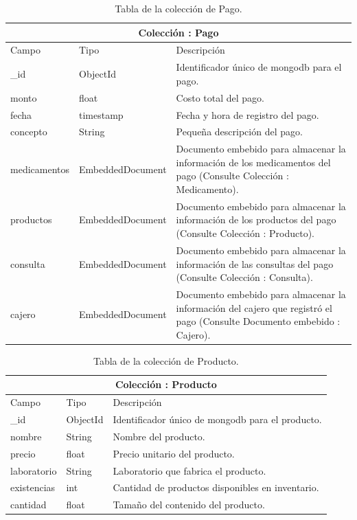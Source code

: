 	 
	 
	 \begin{table}[htb]
		\centering
		\begin{tabular}{| p{3.5cm}| p{3.0cm} | p{9.8cm} |}
			\hline
			\multicolumn{3}{|c|}{Colección : Pago} \\
			\hline
			Campo & Tipo &  Descripción\\ \hline
			\_id & ObjectId & Identificador único de mongodb para el pago. \\ \hline
			monto & float & Costo total del pago.\\ \hline
			fecha & timestamp & Fecha y hora de registro del pago.\\ \hline
			concepto & String & Pequeña descripción del pago.\\ \hline
			medicamentos & EmbeddedDocument & Documento embebido para almacenar la información de los medicamentos del pago (Consulte Colección : Medicamento). \\ \hline
			productos & EmbeddedDocument & Documento embebido para almacenar la información de los productos del pago (Consulte Colección : Producto). \\ \hline
			consulta & EmbeddedDocument & Documento embebido para almacenar la información de las consultas del pago (Consulte Colección : Consulta). \\ \hline
			cajero & EmbeddedDocument & Documento embebido para almacenar la información del cajero que registró el pago (Consulte Documento embebido : Cajero). \\ \hline
		\end{tabular}
		\caption{Tabla de la colección de Pago.}
		\label{tabla:diccionarioDatos}
	\end{table}
	
	\begin{table}[htb]
		\centering
		\begin{tabular}{| p{3.5cm}| p{3.0cm} | p{9.8cm} |}
			\hline
			\multicolumn{3}{|c|}{Colección : Producto} \\
			\hline
			Campo & Tipo &  Descripción\\ \hline
			\_id & ObjectId & Identificador único de mongodb para el producto. \\ \hline
			nombre & String & Nombre del producto.\\ \hline
			precio & float & Precio unitario del producto.\\ \hline
			laboratorio & String & Laboratorio que fabrica el producto.\\ \hline
			existencias & int & Cantidad de productos disponibles en inventario.\\ \hline
			cantidad & float & Tamaño del contenido del producto.\\ \hline
		\end{tabular}
		\caption{Tabla de la colección de Producto.}
		\label{tabla:diccionarioDatos}
	\end{table}
	
